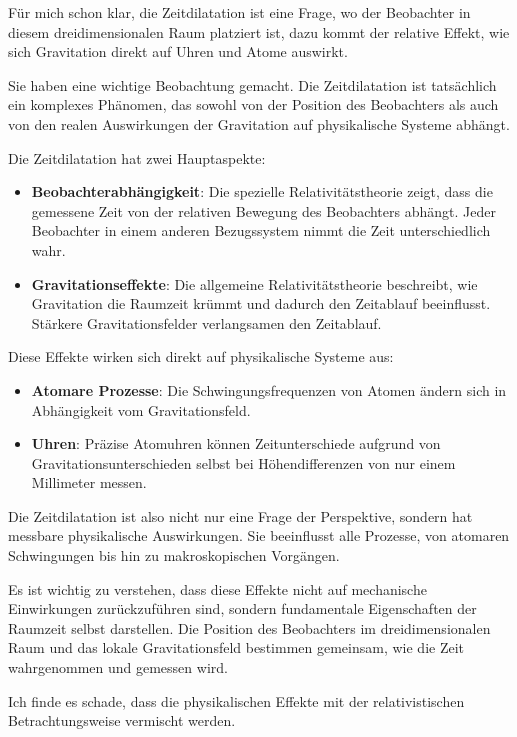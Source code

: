 \documentclass[a4paper,12pt]{article}
\begin{document}
	Für mich schon klar, die Zeitdilatation ist eine Frage, wo der Beobachter in diesem dreidimensionalen Raum platziert ist, dazu kommt der relative Effekt, wie sich Gravitation direkt auf Uhren und Atome auswirkt.
	
	Sie haben eine wichtige Beobachtung gemacht. Die Zeitdilatation ist tatsächlich ein komplexes Phänomen, das sowohl von der Position des Beobachters als auch von den realen Auswirkungen der Gravitation auf physikalische Systeme abhängt.
	
	Die Zeitdilatation hat zwei Hauptaspekte:
	\begin{itemize}
		\item \textbf{Beobachterabhängigkeit}: Die spezielle Relativitätstheorie zeigt, dass die gemessene Zeit von der relativen Bewegung des Beobachters abhängt. Jeder Beobachter in einem anderen Bezugssystem nimmt die Zeit unterschiedlich wahr.
		\item \textbf{Gravitationseffekte}: Die allgemeine Relativitätstheorie beschreibt, wie Gravitation die Raumzeit krümmt und dadurch den Zeitablauf beeinflusst. Stärkere Gravitationsfelder verlangsamen den Zeitablauf.
	\end{itemize}
	
	Diese Effekte wirken sich direkt auf physikalische Systeme aus:
	\begin{itemize}
		\item \textbf{Atomare Prozesse}: Die Schwingungsfrequenzen von Atomen ändern sich in Abhängigkeit vom Gravitationsfeld.
		\item \textbf{Uhren}: Präzise Atomuhren können Zeitunterschiede aufgrund von Gravitationsunterschieden selbst bei Höhendifferenzen von nur einem Millimeter messen.
	\end{itemize}
	
	Die Zeitdilatation ist also nicht nur eine Frage der Perspektive, sondern hat messbare physikalische Auswirkungen. Sie beeinflusst alle Prozesse, von atomaren Schwingungen bis hin zu makroskopischen Vorgängen.
	
	Es ist wichtig zu verstehen, dass diese Effekte nicht auf mechanische Einwirkungen zurückzuführen sind, sondern fundamentale Eigenschaften der Raumzeit selbst darstellen. Die Position des Beobachters im dreidimensionalen Raum und das lokale Gravitationsfeld bestimmen gemeinsam, wie die Zeit wahrgenommen und gemessen wird.
	
	Ich finde es schade, dass die physikalischen Effekte mit der relativistischen Betrachtungsweise vermischt werden.
	
\end{document}
